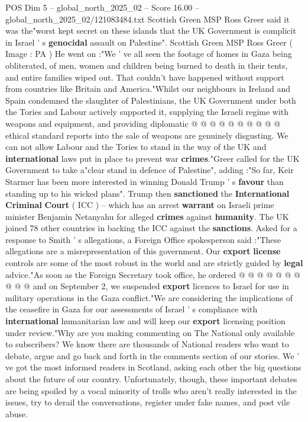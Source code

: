 \begin{textsample}{POS Dim 5 – global\_north\_2025\_02 – Score 16.00 – global\_north\_2025\_02/121083484.txt}
Scottish Green MSP Ross Greer said it was the"worst kept secret on these islands that the UK Government is complicit in Israel ' s \textbf{genocidal} assault on Palestine".
Scottish Green MSP Ross Greer ( Image : PA ) He went on :"We ' ve all seen the footage of homes in Gaza being obliterated, of men, women and children being burned to death in their tents, and entire families wiped out.
That couldn't have happened without support from countries like Britain and America."Whilst our neighbours in Ireland and Spain condemned the slaughter of Palestinians, the UK Government under both the Tories and Labour actively supported it, supplying the Israeli regime with weapons and equipment, and providing diplomatic @ @ @ @ @ @ @ @ @ @ ethical standard reports into the sale of weapons are genuinely disgusting.
We can not allow Labour and the Tories to stand in the way of the UK and \textbf{international} laws put in place to prevent war \textbf{crimes}."Greer called for the UK Government to take a"clear stand in defence of Palestine", adding :"So far, Keir Starmer has been more interested in winning Donald Trump ' s \textbf{favour} than standing up to his wicked plans".
Trump then \textbf{sanctioned} the \textbf{International} \textbf{Criminal} \textbf{Court} ( ICC ) -- which has an arrest \textbf{warrant} on Israeli prime minister Benjamin Netanyahu for alleged \textbf{crimes} against \textbf{humanity}.
The UK joined 78 other countries in backing the ICC against the \textbf{sanctions}.
Asked for a response to Smith ' s allegations, a Foreign Office spokesperson said :"These allegations are a misrepresentation of this government.
Our \textbf{export} \textbf{license} controls are some of the most robust in the world and are strictly guided by \textbf{legal} advice."As soon as the Foreign Secretary took office, he ordered @ @ @ @ @ @ @ @ @ @ and on September 2, we suspended \textbf{export} licences to Israel for use in military operations in the Gaza conflict."We are considering the implications of the ceasefire in Gaza for our assessments of Israel ' s compliance with \textbf{international} humanitarian law and will keep our \textbf{export} licensing position under review."Why are you making commenting on The National only available to subscribers?
We know there are thousands of National readers who want to debate, argue and go back and forth in the comments section of our stories.
We ' ve got the most informed readers in Scotland, asking each other the big questions about the future of our country.
Unfortunately, though, these important debates are being spoiled by a vocal minority of trolls who aren't really interested in the issues, try to derail the conversations, register under fake names, and post vile abuse.

\end{textsample}
